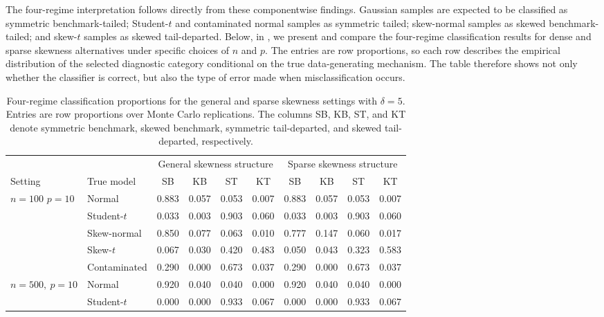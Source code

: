 \documentclass[11pt]{article}
\theoremstyle{plain}
\theoremstyle{definition}
\theoremstyle{remark}
\begin{document}
The four-regime interpretation follows directly from these componentwise findings.  Gaussian samples are expected to be classified as symmetric benchmark-tailed; Student-$t$ and contaminated normal samples as symmetric tailed; skew-normal samples as skewed benchmark-tailed; and skew-$t$ samples as skewed tail-departed. Below, in , we present and compare the four-regime classification results for dense and sparse skewness alternatives under specific choices of $n$ and $p$.  The entries are row proportions, so each row describes the empirical distribution of the selected diagnostic category conditional on the true data-generating mechanism.  The table therefore shows not only whether the classifier is correct, but also the type of error made when misclassification occurs.

\begin{table}[!ht]
\centering
\scriptsize
\caption{Four-regime classification proportions for the general and sparse skewness settings with $\delta=5$. Entries are row proportions over Monte Carlo replications. The columns SB, KB, ST, and KT denote symmetric benchmark, skewed benchmark, symmetric tail-departed, and skewed tail-departed, respectively.}
\label{tab:classification_dense_sparse}
\begin{tabular}{llcccc@{\hspace{2em}}cccc}
\toprule
& & \multicolumn{4}{c}{General skewness structure} & \multicolumn{4}{c}{Sparse skewness structure} \\
\cmidrule(lr){3-6} \cmidrule(lr){7-10}
Setting & True model
& SB & KB & ST & KT
& SB & KB & ST & KT \\
\midrule
$n=100$ $p=10$& Normal              & 0.883 & 0.057 & 0.053 & 0.007 & 0.883 & 0.057 & 0.053 & 0.007 \\
& Student-$t$         & 0.033 & 0.003 & 0.903 & 0.060 & 0.033 & 0.003 & 0.903 & 0.060 \\
& Skew-normal         & 0.850 & 0.077 & 0.063 & 0.010 & 0.777 & 0.147 & 0.060 & 0.017 \\
& Skew-$t$            & 0.067 & 0.030 & 0.420 & 0.483 & 0.050 & 0.043 & 0.323 & 0.583 \\
& Contaminated & 0.290 & 0.000 & 0.673 & 0.037 & 0.290 & 0.000 & 0.673 & 0.037 \\
\midrule
$n=500,\ p=10$ & Normal              & 0.920 & 0.040 & 0.040 & 0.000 & 0.920 & 0.040 & 0.040 & 0.000 \\
& Student-$t$         & 0.000 & 0.000 & 0.933 & 0.067 & 0.000 & 0.000 & 0.933 & 0.067 \\

\end{tabular}
\end{table}
\end{document}
